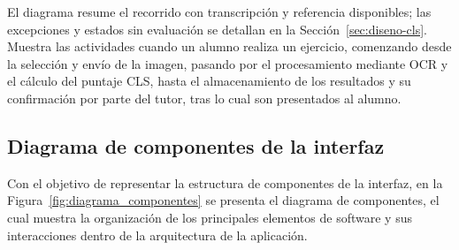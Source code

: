 El diagrama resume el recorrido con transcripción y referencia disponibles; las excepciones y estados sin evaluación se detallan en la Sección~\ref{sec:diseno-cls}. Muestra las actividades cuando un alumno realiza un ejercicio, comenzando desde la selección y envío de la imagen, pasando por el procesamiento mediante OCR y el cálculo del puntaje CLS, hasta el almacenamiento de los resultados y su confirmación por parte del tutor, tras lo cual son presentados al alumno.





            

\subsection{Diagrama de componentes de la interfaz}

Con el objetivo de representar la estructura de componentes de la interfaz, en la Figura~\ref{fig:diagrama_componentes} se presenta el diagrama de componentes, el cual muestra la organización de los principales elementos de software y sus interacciones dentro de la arquitectura de la aplicación.

